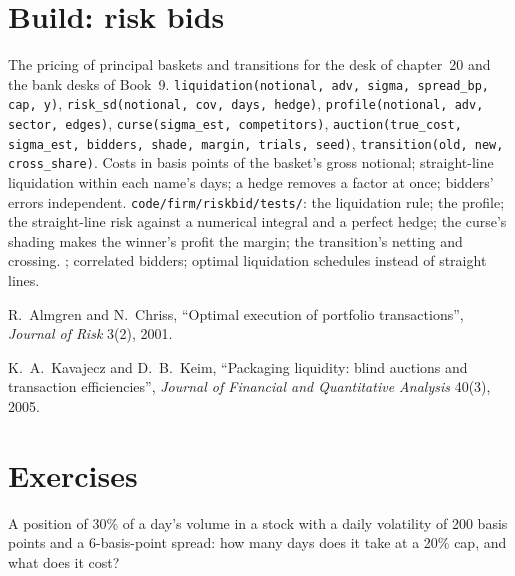 \section{Build: risk bids}\label{bld:mx:portfolio-trades-and-risk-bids:riskbid}

\begin{build}
 The pricing of principal baskets and transitions for the desk of chapter~20 and the bank desks of Book~9.
 \texttt{liquidation(notional, adv, sigma, spread\_bp, cap, y)}, \texttt{risk\_sd(notional, cov, days, hedge)},
\texttt{profile(notional, adv, sector, edges)}, \texttt{curse(sigma\_est, competitors)}, \texttt{auction(true\_cost, sigma\_est, bidders, shade,
margin, trials, seed)}, \texttt{transition(old, new, cross\_share)}.
 Costs in basis points of the basket's gross notional; straight-line liquidation within each name's days; a hedge removes a factor at
once; bidders' errors independent.
 \texttt{code/firm/riskbid/tests/}: the liquidation rule; the profile; the straight-line risk against a numerical integral
and a perfect hedge; the curse's shading makes the winner's profit the margin; the transition's netting and crossing.
 ; correlated bidders; optimal liquidation schedules instead of straight lines.
\end{build}

\begin{omsources}
\item R.~Almgren and N.~Chriss, ``Optimal execution of portfolio transactions'', \emph{Journal of Risk} 3(2), 2001.
\item K.~A.~Kavajecz and D.~B.~Keim, ``Packaging liquidity: blind auctions and transaction efficiencies'', \emph{Journal of Financial and
Quantitative Analysis} 40(3), 2005.
\end{omsources}

\section{Exercises}

\begin{exercise}[$\star$]\label{exo:mx:portfolio-trades-and-risk-bids:1}
A position of 30\% of a day's volume in a stock with a daily volatility of 200 basis points and a 6-basis-point spread: how many days does it take at
a 20\% cap, and what does it cost?
\end{exercise}

